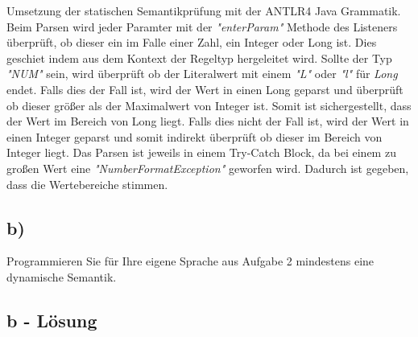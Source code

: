 Umsetzung der statischen Semantikprüfung mit der ANTLR4 Java Grammatik.
Beim Parsen wird jeder Paramter mit der \textit{"enterParam"} Methode des Listeners überprüft, ob dieser ein im Falle einer Zahl, ein Integer oder Long ist.
Dies geschiet indem aus dem Kontext der Regeltyp hergeleitet wird.
Sollte der Typ \textit{"NUM"} sein, wird überprüft ob der Literalwert mit einem \textit{"L"} oder \textit{"l"} für \textit{Long} endet.
Falls dies der Fall ist, wird der Wert in einen Long geparst und überprüft ob dieser größer als der Maximalwert von Integer ist.
Somit ist sichergestellt, dass der Wert im Bereich von Long liegt.
Falls dies nicht der Fall ist, wird der Wert in einen Integer geparst und somit indirekt überprüft ob dieser im Bereich von Integer liegt.
Das Parsen ist jeweils in einem Try-Catch Block, da bei einem zu großen Wert eine \textit{"NumberFormatException"} geworfen wird.
Dadurch ist gegeben, dass die Wertebereiche stimmen.

\subsection*{b)}
Programmieren Sie für Ihre eigene Sprache aus Aufgabe 2 mindestens eine dynamische Semantik.

\subsection*{b - Lösung}
\newline

